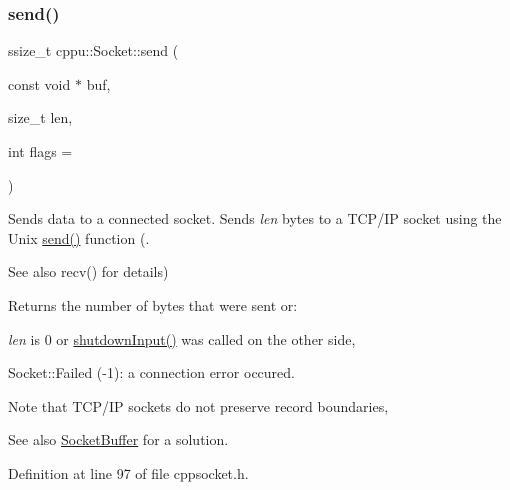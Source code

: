 \subsubsection{\texorpdfstring{send()}{send()}}
{\footnotesize\ttfamily ssize\+\_\+t cppu\+::\+Socket\+::send (\begin{DoxyParamCaption}\item[{const void $\ast$}]{buf,  }\item[{size\+\_\+t}]{len,  }\item[{int}]{flags = {} }\end{DoxyParamCaption})\hspace{0.3cm}{\ttfamily [inline]}}



Sends data to a connected socket. Sends {\itshape len} bytes to a T\+C\+P/\+IP socket using the Unix \mbox{\hyperlink{classcppu_1_1_socket_aeac77f859159715e2d63a5a0dc118788}{send()}} function (. 

\begin{DoxySeeAlso}{See also}
recv() for details)
\end{DoxySeeAlso}
\begin{DoxyReturn}{Returns}
the number of bytes that were sent or\+:
\begin{DoxyItemize}
\item {\itshape len} is 0 or \mbox{\hyperlink{classcppu_1_1_socket_a06c6838f267e5a0ba74558da946efb90}{shutdown\+Input()}} was called on the other side,
\item Socket\+::\+Failed (-\/1)\+: a connection error occured.
\end{DoxyItemize}
\end{DoxyReturn}
\begin{DoxyNote}{Note}
that T\+C\+P/\+IP sockets do not preserve record boundaries, 
\end{DoxyNote}
\begin{DoxySeeAlso}{See also}
\mbox{\hyperlink{classcppu_1_1_socket_buffer}{Socket\+Buffer}} for a solution. 
\end{DoxySeeAlso}


Definition at line 97 of file cppsocket.\+h.


\begin{DoxyCode}{0}

\end{DoxyCode}
\mbox{\label{classcppu_1_1_socket_a31ff5137959aa4e52d4bcdd53e0b0069}} 
